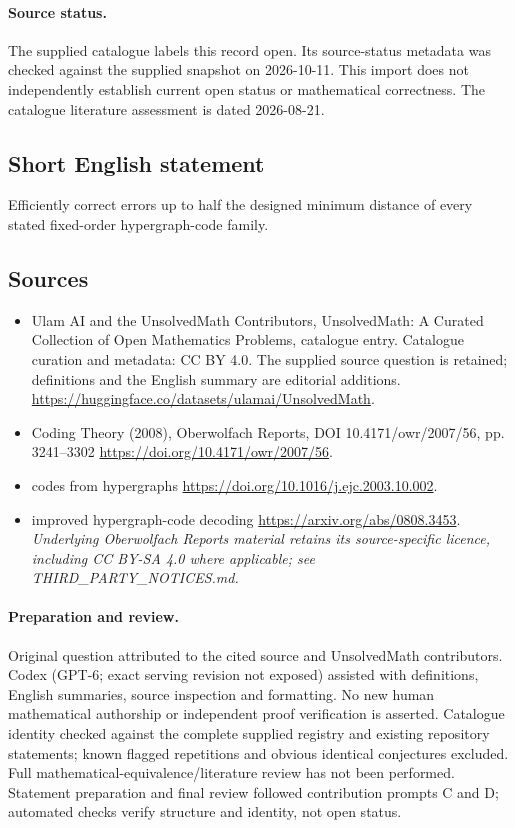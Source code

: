 \documentclass[11pt]{article}
\begin{document}
\paragraph{Source status.}
The supplied catalogue labels this record open. Its source-status metadata was checked against the supplied snapshot on 2026-10-11. This import does not independently establish current open status or mathematical correctness. The catalogue literature assessment is dated 2026-08-21.
\subsection{Short English statement}
Efficiently correct errors up to half the designed minimum distance of every stated fixed-order hypergraph-code family.
\subsection{Sources}
\begin{itemize}
\item[\hypertarget{source:statement:1}{S1}] Ulam AI and the UnsolvedMath Contributors, UnsolvedMath: A Curated Collection of Open Mathematics Problems, catalogue entry. Catalogue curation and metadata: CC BY 4.0. The supplied source question is retained; definitions and the English summary are editorial additions.
\url{https://huggingface.co/datasets/ulamai/UnsolvedMath}.
\item[\hypertarget{source:statement:2}{S2}] Coding Theory (2008), Oberwolfach Reports, DOI 10.4171/owr/2007/56, pp. 3241--3302
\url{https://doi.org/10.4171/owr/2007/56}.
\item[\hypertarget{source:statement:3}{S3}] codes from hypergraphs
\url{https://doi.org/10.1016/j.ejc.2003.10.002}.
\item[\hypertarget{source:statement:4}{S4}] improved hypergraph-code decoding
\url{https://arxiv.org/abs/0808.3453}.
\textit{Underlying Oberwolfach Reports material retains its source-specific licence, including CC BY-SA 4.0 where applicable; see THIRD\_PARTY\_NOTICES.md.}
\end{itemize}
\paragraph{Preparation and review.}
Original question attributed to the cited source and UnsolvedMath contributors. Codex (GPT-6; exact serving revision not exposed) assisted with definitions, English summaries, source inspection and formatting. No new human mathematical authorship or independent proof verification is asserted. Catalogue identity checked against the complete supplied registry and existing repository statements; known flagged repetitions and obvious identical conjectures excluded. Full mathematical-equivalence/literature review has not been performed. Statement preparation and final review followed contribution prompts C and D; automated checks verify structure and identity, not open status.
\label{end:statement}
\end{document}
